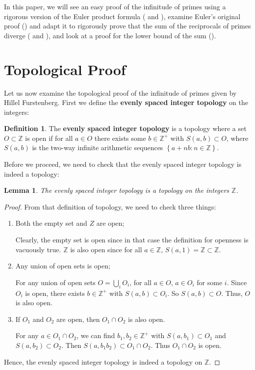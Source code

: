 \documentclass[a4paper]{article}
\newtheorem{lemma}[theorem]{Lemma}
\theoremstyle{definition}
\newtheorem{definition}{Definition}[section]
\theoremstyle{remark}
\begin{document}
In this paper, we will see an easy proof of the infinitude of primes using a rigorous version of the Euler product formula ( and ), examine Euler's original proof () and adapt it to rigorously prove that the sum of the reciprocals of primes diverge ( and ), and look at a proof for the lower bound of the sum ().
\section{Topological Proof}
\label{sec:topological}
Let us now examine the topological proof of the infinitude of primes given by Hillel Furstenberg.
First we define the \textbf{evenly spaced integer topology} on the integers:
\begin{definition}
  The \textbf{evenly spaced integer topology} is a topology where a set $O\subset\mathbb{Z}$ is open if for all $a\in O$ there exists some $b\in\mathbb{Z^+}$ with $S(a,b)\subset O$, where $S(a,b)$ is the two-way infinite arithmetic sequences $\left\{ a+nb:n\in\mathbb{Z} \right\}$.
  \label{def:esip}
\end{definition}
Before we proceed, we need to check that the evenly spaced integer topology is indeed a topology:
\begin{lemma}
  The evenly spaced integer topology is a topology on the integers $\mathbb{Z}$.
  \label{lem:esip}
\end{lemma}
\begin{proof}
  From that definition of topology, we need to check three things:
  \begin{enumerate}
    \item Both the empty set and $Z$ are open;

      Clearly, the empty set is open since in that case the definition for openness is vacuously true. $\mathbb{Z}$ is also open since for all $a\in\mathbb{Z}$, $S(a,1)=\mathbb{Z}\subset\mathbb{Z}$.
    \item Any union of open sets is open;

      For any union of open sets $O=\bigcup\limits_i O_i$, for all $a\in O$, $a\in O_i$ for some $i$. Since $O_i$ is open, there exists $b\in\mathbb{Z^+}$ with $S(a,b)\subset O_i$. So $S(a,b)\subset O$. Thus, $O$ is also open.
    \item If $O_1$ and $O_2$ are open, then $O_1\cap O_2$ is also open.

      For any $a\in O_1\cap O_2$, we can find $b_1,b_2\in\mathbb{Z^+}$ with $S(a,b_1)\subset O_1$ and $S(a,b_2)\subset O_2$. Then $S(a,b_1b_2)\subset O_1\cap O_2$. Thus $O_1\cap O_2$ is open.

  \end{enumerate}
  Hence, the evenly spaced integer topology is indeed a topology on $\mathbb{Z}$.
\end{proof}
\end{document}
